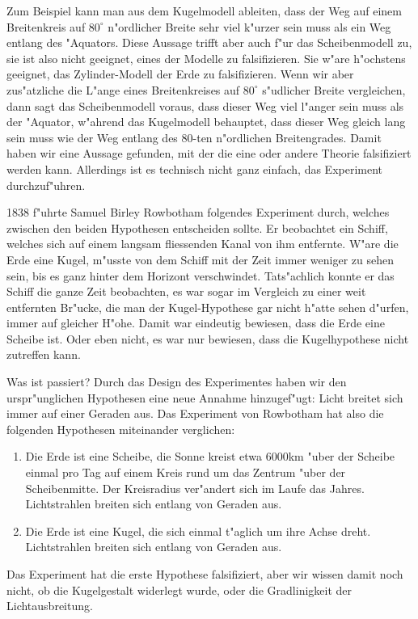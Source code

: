 Zum Beispiel kann man aus dem Kugelmodell ableiten, dass der Weg
auf einem Breitenkreis auf $80^\circ$ n"ordlicher Breite
sehr viel k"urzer sein muss als ein Weg entlang des "Aquators.
Diese Aussage trifft aber auch f"ur das Scheibenmodell zu, sie
ist also nicht geeignet, eines der Modelle zu falsifizieren.
Sie w"are h"ochstens geeignet, das Zylinder-Modell der Erde
zu falsifizieren.
Wenn wir aber zus"atzliche die L"ange eines Breitenkreises 
auf $80^\circ$ s"udlicher Breite vergleichen, dann sagt
das Scheibenmodell voraus, dass dieser Weg viel l"anger
sein muss als der "Aquator, w"ahrend das Kugelmodell behauptet,
dass dieser Weg gleich lang sein muss wie der Weg entlang des
$80$-ten n"ordlichen Breitengrades.
Damit haben wir eine Aussage gefunden, mit der die eine oder andere
Theorie falsifiziert werden kann.
Allerdings ist es technisch nicht ganz einfach, das Experiment
durchzuf"uhren.

1838 f"uhrte Samuel Birley Rowbotham folgendes Experiment durch,
welches zwischen den beiden Hypothesen entscheiden sollte.
Er beobachtet ein Schiff, welches sich auf einem langsam fliessenden
Kanal von ihm entfernte.
W"are die Erde eine Kugel, m"usste von dem Schiff mit der Zeit
immer weniger zu sehen sein, bis es ganz hinter dem Horizont
verschwindet.
Tats"achlich konnte er das Schiff die ganze Zeit beobachten, es
war sogar im Vergleich zu einer weit entfernten Br"ucke, die
man der Kugel-Hypothese gar nicht h"atte sehen d"urfen, immer auf
gleicher H"ohe.
Damit war eindeutig bewiesen, dass die Erde eine Scheibe ist.
Oder eben nicht, es war nur bewiesen, dass die Kugelhypothese
nicht zutreffen kann.

Was ist passiert? 
Durch das Design des Experimentes haben wir den urspr"unglichen
Hypothesen eine neue Annahme hinzugef"ugt: Licht breitet sich
immer auf einer Geraden aus.
Das Experiment von Rowbotham hat also die folgenden Hypothesen miteinander
verglichen:
\begin{enumerate}
\item Die Erde ist eine Scheibe, die Sonne kreist etwa 6000km "uber der
Scheibe einmal pro Tag auf einem Kreis rund um das Zentrum "uber der
Scheibenmitte. 
Der Kreisradius ver"andert sich im Laufe das Jahres.
Lichtstrahlen breiten sich entlang von Geraden aus.
\item Die Erde ist eine Kugel, die sich einmal t"aglich um ihre
Achse dreht.
Lichtstrahlen breiten sich entlang von Geraden aus.
\end{enumerate}
Das Experiment hat die erste Hypothese falsifiziert, aber wir wissen
damit noch nicht, ob die Kugelgestalt widerlegt wurde, oder die
Gradlinigkeit der Lichtausbreitung.

